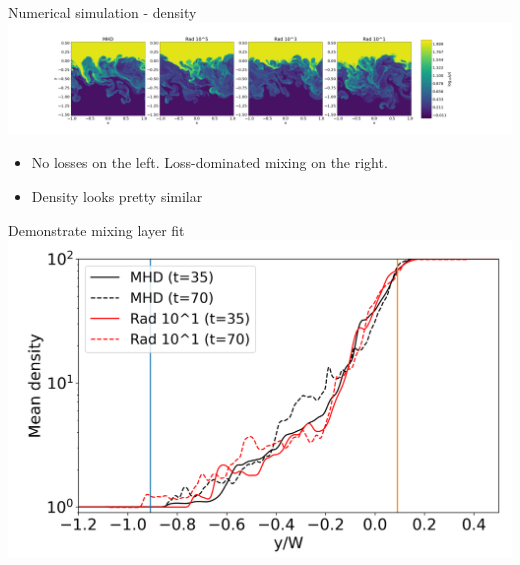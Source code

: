 \documentclass[10pt,aspectratio=169,usenames,dvipsnames]{beamer}
\begin{document}
\begin{frame}{Numerical simulation - density}
    \centering
   \includegraphics[width=0.99\linewidth,clip=true,trim=7.9cm 0.8cm 8.9cm 0.8cm]{2023Dundee/Figures/denstempevo_rho_t0071.png}
\begin{itemize}
    \item No losses on the left. Loss-dominated mixing on the right.
    \item Density looks pretty similar
\end{itemize}
\end{frame}

\begin{frame}{Demonstrate mixing layer fit}
\centering
\includegraphics[width=0.85\linewidth]{2023Dundee/Figures/framecheck.png}
\end{frame}
\end{document}
